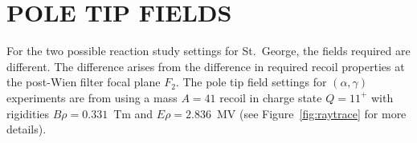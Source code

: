 \chapter{POLE TIP FIELDS}

For the two possible reaction study settings for St.\ George, the fields
required are different. The difference arises from the difference in required
recoil properties at the post-Wien filter focal plane $F_2$. The pole tip field
settings for $(\alpha,\gamma)$ experiments are from using a mass $A = 41$
recoil in charge state $Q = 11^+$ with rigidities $B\rho = 0.331$~Tm and
$E\rho = 2.836$~MV (see Figure~\ref{fig:raytrace} for more details).

